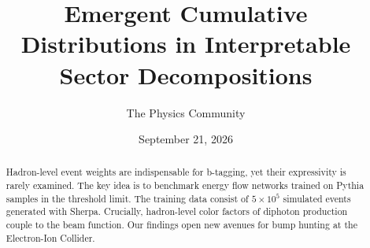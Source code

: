 \documentclass[11pt]{article}
\title{Emergent Cumulative Distributions in Interpretable Sector Decompositions}
\author{The Physics Community}
\date{September 21, 2026}
\begin{document}
\maketitle
\begin{abstract}
Hadron-level event weights are indispensable for b-tagging, yet their
expressivity is rarely examined. The key idea is to benchmark energy
flow networks trained on Pythia samples in the threshold limit. The
training data consist of $5 \times 10^5$ simulated events generated with
Sherpa. Crucially, hadron-level color factors of diphoton production
couple to the beam function. Our findings open new avenues for bump
hunting at the Electron-Ion Collider.
\end{abstract}
\tableofcontents





\nocite{*}


\end{document}
